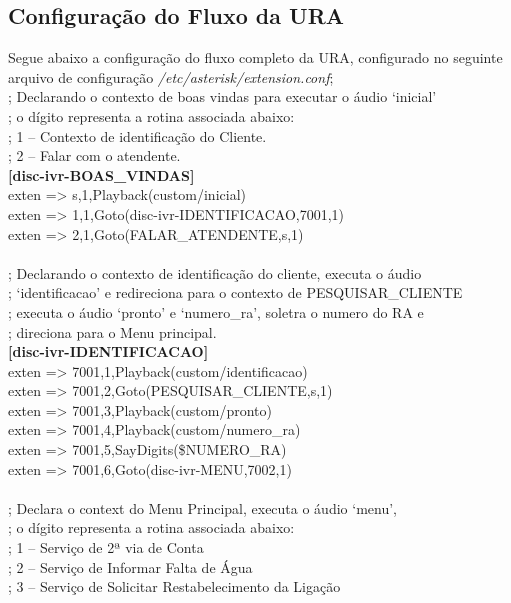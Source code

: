 \begin{apendicesenv}
\chapter{Configuração do Fluxo da URA}
Segue abaixo a configuração do fluxo completo da URA, configurado no seguinte arquivo de configuração \textit{/etc/asterisk/extension.conf};
\\[8pt]
; Declarando o contexto de boas vindas para executar o áudio ‘inicial’ \\
; o dígito representa a rotina associada abaixo: \\
; 1 – Contexto de identificação do Cliente. \\
; 2 – Falar com o atendente. \\
\textbf{[disc-ivr-BOAS\_VINDAS] }	 \\
exten => s,1,Playback(custom/inicial)  \\
exten => 1,1,Goto(disc-ivr-IDENTIFICACAO,7001,1)  \\
exten => 2,1,Goto(FALAR\_ATENDENTE,s,1)  \\
 \\
; Declarando o contexto de identificação do cliente, executa o áudio  \\
; ‘identificacao’ e redireciona para o contexto de PESQUISAR\_CLIENTE \\
; executa o áudio ‘pronto’ e ‘numero\_ra’, soletra o numero do RA e  \\
; direciona para o Menu principal. \\
\textbf{[disc-ivr-IDENTIFICACAO]} \\
exten => 7001,1,Playback(custom/identificacao) \\
exten => 7001,2,Goto(PESQUISAR\_CLIENTE,s,1) \\
exten => 7001,3,Playback(custom/pronto) \\
exten => 7001,4,Playback(custom/numero\_ra) \\
exten => 7001,5,SayDigits(\${NUMERO\_RA}) \\
exten => 7001,6,Goto(disc-ivr-MENU,7002,1) \\
 \\
; Declara o context do Menu Principal, executa o áudio ‘menu’, \\
; o dígito representa a rotina associada abaixo: \\
; 1 – Serviço de 2ª via de Conta \\
; 2 – Serviço de Informar Falta de Água \\
; 3 – Serviço de Solicitar Restabelecimento da Ligação \\

\end{apendicesenv}
